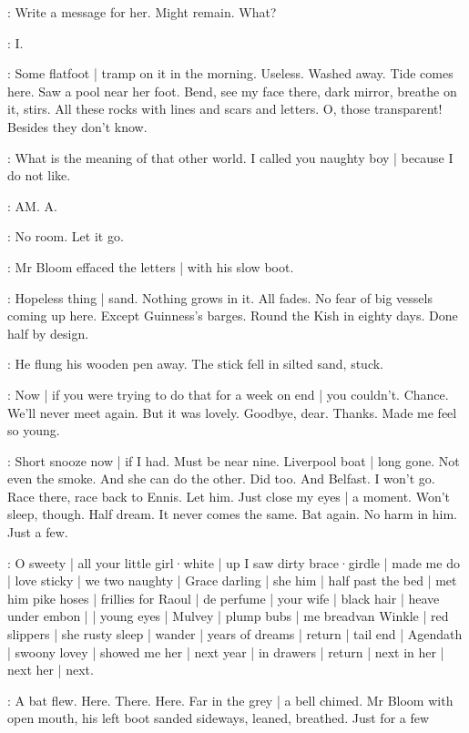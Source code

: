 \BloomCurrent:
Write a message for her.
Might remain.
What?

\BloomCurrent:
I.

\BloomCurrent:
Some flatfoot |
tramp on it in the morning.
Useless.
Washed away.
Tide comes here.%
Saw a pool near her foot.
Bend,
see my face there,
dark mirror,
breathe on it,
stirs.
All these rocks
with lines and scars and letters.
O,
those transparent!
Besides
they don't know.

\BloomToday:
What is the meaning of that other world.
I called you naughty boy |
because I do not like.

\BloomCurrent:
AM.
A.

\BloomCurrent:
No room.
Let it go.

:
Mr Bloom effaced the letters |
with his slow boot.

\BloomAbstract:
Hopeless thing |
sand.
Nothing grows in it.
All fades.
No fear of big vessels coming up here.
Except Guinness's barges.
Round the Kish in eighty days.
Done half by design.

:
He flung his wooden pen away.%
The stick fell in silted sand,
stuck.

\BloomCurrent:
Now |
if you were trying to do that for a week on end |
you couldn't.
Chance.
We'll never meet again.
But it was lovely.
Goodbye,
dear.
Thanks.
Made me feel so young.

\BloomCurrent:
Short snooze now |
if I had.
Must be near nine.
Liverpool boat |
long gone.
Not even the smoke.
And she can do the other.
Did too.
And Belfast.
I won't go.
Race there,
race back to Ennis.
Let him.
Just close my eyes |
a moment.
Won't sleep,
though.
Half dream.
It never comes the same.
Bat again.
No harm in him.
Just a few.

\BloomToday:
O sweety |
all your little girl·white |
up I saw dirty brace·girdle |
made me do |
love sticky |
we two naughty |
Grace darling |%
she him |
half past the bed |
met him pike hoses |
frillies for Raoul |
de perfume |
your wife |
black hair |
heave under embon |
 |
young eyes |
Mulvey |
plump bubs |
me breadvan Winkle |
red slippers |
she rusty sleep |
wander |
years of dreams |
return |
tail end |
Agendath |
swoony lovey |
showed me her |
next year |
in drawers |
return |
next in her |
next her |
next.

:
A bat flew.
Here.
There.
Here.
Far in the grey |
a bell chimed.
Mr Bloom with open mouth,
his left boot sanded sideways,
leaned,
breathed.
Just for a few


